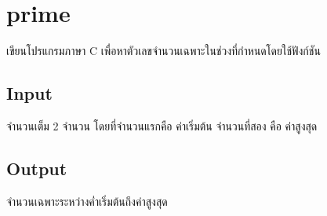 \documentclass{article}
\begin{document}
\section*{prime}

เขียนโปรแกรมภาษา C เพื่อหาตัวเลขจำนวนเฉพาะในช่วงที่กำหนดโดยใช้ฟังก์ชัน\\



\subsection*{Input}
จำนวนเต็ม 2 จำนวน โดยที่จำนวนแรกคือ ค่าเริ่มต้น จำนวนที่สอง คือ ค่าสูงสุด



\subsection*{Output}
จำนวนเฉพาะระหว่างค่ำเริ่มต้นถึงค่าสูงสุด
\end{document}
